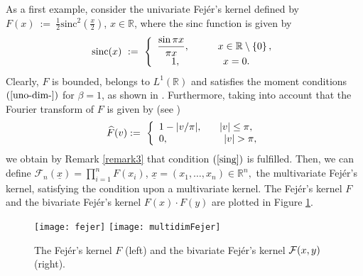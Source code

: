 \documentclass[11pt,a4paper]{article}
\newcommand{\miu}{\leq}
\newcommand{\R}{\mathbb{R}}
\newcommand{\disp}{\displaystyle}
\newcommand{\xx}{\underline{x}}
\begin{document}
  As a first example, consider the univariate Fej\'{e}r's kernel defined by $F(x)\ :=\ \frac{1}{2}\mbox{sinc}^2\left(\frac{x}{2}\right)$, $x \in \R$, where the sinc function is given by
\begin{displaymath}
\mbox{sinc}(x)\ :=\ \left\{
\begin{array}{l}
\disp \frac{\sin \pi x}{\pi x}, \hskip1cm x \in \R\setminus \left\{0\right\}, \\
\hskip0.5cm 1, \hskip1.5cm x=0.
\end{array}
\right.
\end{displaymath}
Clearly, $F$ is bounded, belongs to $L^1(\R)$ and satisfies the moment conditions $(\ref{uno-dim-})$ for $\beta = 1$, as shown in \cite{BUNE,BABUSTVI,COVI}. 
Furthermore, taking into account that the Fourier transform of $F$ is given by (see \cite{BUNE})
\begin{displaymath}
\widehat{F}(v) :=\ \left\{
\begin{array}{l}
1-|v/\pi|,\ \hskip0.5cm |v|\miu \pi, \\
0,\ \hskip1.85cm |v|>\pi,
\end{array}
\right.
\end{displaymath}
we obtain by Remark \ref{remark3} that condition $(\ref{sing})$ is fulfilled. Then, we can define $\disp \mathcal{F}_n(\xx)= \prod^n_{i=1}F(x_i)$, $\underline{x}=(x_1,\dots,x_n) \in \R^n,$ the multivariate Fej\'{e}r's kernel, satisfying the condition upon a multivariate kernel. The Fej\'{e}r's kernel $F$ and the bivariate Fej\'{e}r's kernel $F(x)\cdot F(y)$ are plotted in Figure \ref{fig1}.
\begin{figure}
\centering
\texttt{[image: fejer]}
\hskip0.8cm
\texttt{[image: multidimFejer]}
\caption{\small{The Fej\'{e}r's kernel $F$ (left) and the bivariate Fej\'{e}r's kernel ${\cal F}(x,y)$ (right).}} \label{fig1}
\end{figure}
%
\end{document}

